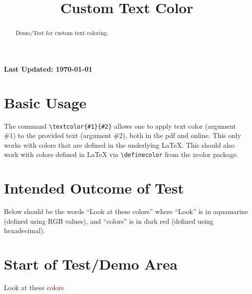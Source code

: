 \documentclass{ximera}
\title{Custom Text Color}
\begin{document}
\begin{abstract}
    Demo/Test for custom text coloring.
\end{abstract}
\maketitle

{{\Huge \bfseries Last Updated: \today}} \\


\section{Basic Usage}
The command \verb|\textcolor{#1}{#2}| allows one to apply text color (argument \#1) to the provided text (argument \#2), both in the pdf and online. 
This only works with colors that are defined in the underlying LaTeX. This should also work with colors defined in LaTeX via \verb|\definecolor| from
the xcolor package. 

\section{Intended Outcome of Test}
Below should be the words ``Look at these colors'' where ``Look'' is in aquamarine (defined using RGB values), 
and ``colors'' is in dark red (defined using hexadecimal).

\section{Start of Test/Demo Area}
\textcolor{xmlightblue}{Look} at these \textcolor{darkred}{colors}

\hrulefill
\end{document}

